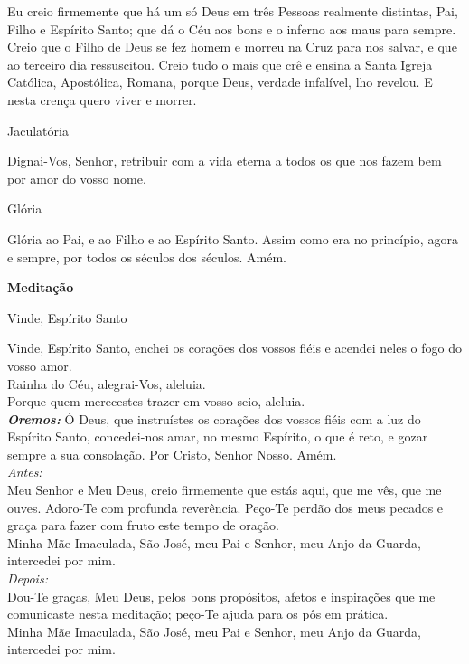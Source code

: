 \documentclass{book}
\begin{document}
\begin{flushleft}
    Eu creio firmemente que há um só Deus em três Pessoas realmente distintas, Pai, Filho e Espírito Santo; que dá o Céu aos bons e o inferno aos maus para sempre. Creio que o Filho de Deus se fez homem e morreu na Cruz para nos salvar, e que ao terceiro dia ressuscitou. Creio tudo o mais que crê e ensina a Santa Igreja Católica, Apostólica, Romana, porque Deus, verdade infalível, lho revelou. E nesta crença quero viver e morrer.
\end{flushleft}
\begin{center}
    Jaculatória
\end{center}
\begin{flushleft}
    Dignai-Vos, Senhor, retribuir com a vida eterna a todos os que nos fazem bem por amor do vosso nome.
\end{flushleft}
\begin{center}
    Glória
\end{center}
\begin{flushleft}
    Glória ao Pai, e ao Filho e ao Espírito Santo. Assim como era no princípio, agora e sempre, por todos os séculos dos séculos. Amém.
\end{flushleft}
\newpage
\begin{center}
    \textbf{Meditação}
\end{center}
\begin{center}
    Vinde, Espírito Santo
\end{center}
\begin{flushleft}
    Vinde, Espírito Santo, enchei os corações dos vossos fiéis e acendei neles o fogo do vosso amor. \\
    \VbarRed{} Rainha do Céu, alegrai-Vos, aleluia. \\
    \RbarRed{} Porque quem merecestes trazer em vosso seio, aleluia. \\
    \hfill{} \break{}
    \textbf{\textit{Oremos:}} Ó Deus, que instruístes os corações dos vossos fiéis com a luz do Espírito Santo, concedei-nos amar, no mesmo Espírito, o que é reto, e gozar sempre a sua consolação. Por Cristo, Senhor Nosso. Amém. \\
    \hfill{} \break{}
    \textit{Antes:} \\ Meu Senhor e Meu Deus, creio firmemente que estás aqui, que me vês, que me ouves. Adoro-Te com profunda reverência. Peço-Te perdão dos meus pecados e graça para fazer com fruto este tempo de oração. \\ Minha Mãe Imaculada, São José, meu Pai e Senhor, meu Anjo da Guarda, intercedei por mim. \\
    \hfill{} \break{}
    \textit{Depois:} \\ Dou-Te graças, Meu Deus, pelos bons propósitos, afetos e inspirações que me comunicaste nesta meditação; peço-Te ajuda para os pôs em prática. \\ Minha Mãe Imaculada, São José, meu Pai e Senhor, meu Anjo da Guarda, intercedei por mim.
\end{flushleft}
\end{document}
